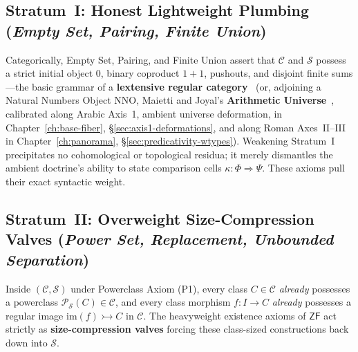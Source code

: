 \subsection{\texorpdfstring{Stratum~I: Honest Lightweight Plumbing (\emph{Empty Set, Pairing, Finite Union})}{Stratum I: Honest Lightweight Plumbing (Empty Set, Pairing, Finite Union)}}\label{subsec:ast-stratum-i}

Categorically, Empty Set, Pairing, and Finite Union assert that $\mathcal{C}$ and $\mathcal{S}$ possess a strict initial object $0$, binary coproduct $1 + 1$, pushouts, and disjoint finite sums---the basic grammar of a \textbf{lextensive regular category}~\cite[Ch.~I]{JoyalMoerdijk95} (or, adjoining a Natural Numbers Object $\mathrm{NNO}$, Maietti and Joyal's \textbf{Arithmetic Universe}~\cite{Maietti05}, calibrated along Arabic Axis~1, ambient universe deformation, in Chapter~\ref{ch:base-fiber}, \S\ref{sec:axis1-deformations}, and along Roman Axes~II--III in Chapter~\ref{ch:panorama}, \S\ref{sec:predicativity-wtypes}). Weakening Stratum~I precipitates no cohomological or topological residua; it merely dismantles the ambient doctrine's ability to state comparison cells $\kappa : \Phi \Rightarrow \Psi$. These axioms pull their exact syntactic weight.

\subsection{\texorpdfstring{Stratum~II: Overweight Size-Compression Valves (\emph{Power Set, Replacement, Unbounded Separation})}{Stratum II: Overweight Size-Compression Valves (Power Set, Replacement, Unbounded Separation)}}\label{subsec:ast-stratum-ii}

Inside $(\mathcal{C}, \mathcal{S})$ under Powerclass Axiom (P1), every class $C \in \mathcal{C}$ \emph{already} possesses a powerclass $\mathcal{P}_{\mathcal{S}}(C) \in \mathcal{C}$, and every class morphism $f : I \to C$ \emph{already} possesses a regular image $\mathrm{im}(f) \rightarrowtail C$ in $\mathcal{C}$. The heavyweight existence axioms of $\mathsf{ZF}$ act strictly as \textbf{size-compression valves} forcing these class-sized constructions back down into $\mathcal{S}$.

